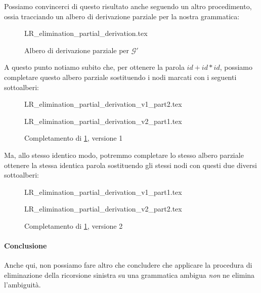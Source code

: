 \documentclass[class=book, crop=false, oneside, 12pt]{standalone}
\begin{document}
Possiamo convincerci di questo risultato anche seguendo un altro procedimento, ossia tracciando un albero di derivazione parziale per la nostra grammatica:
\begin{figure}[H]
    \centering
    {LR_elimination_partial_derivation.tex}
    \caption{Albero di derivazione parziale per \(\mathcal{G'}\)}
    \label{fxness-lrremove- ambiguity_1}
\end{figure}
A questo punto notiamo subito che, per ottenere la parola \(id + id * id\), possiamo completare questo albero parziale sostituendo i nodi marcati con i seguenti sottoalberi:
\begin{figure}[H]
    \begin{minipage}[b]{0.4\textwidth}
        \centering
        {LR_elimination_partial_derivation_v1_part2.tex}
        \subcaption{}
        \label{fxness-lrremove- ambiguity_2_2}
    \end{minipage}
    \hfill
    \begin{minipage}[b]{0.4\textwidth}
        \centering
        {LR_elimination_partial_derivation_v2_part1.tex}
        \subcaption{}
        \label{fxness-lrremove- ambiguity_2_1}
    \end{minipage}
    \caption{Completamento di \ref{fxness-lrremove- ambiguity_1}, versione 1}
    \label{fxness-lrremove- ambiguity_2}
\end{figure}
Ma, allo stesso identico modo, potremmo completare lo stesso albero parziale ottenere la stessa identica parola sostituendo gli stessi nodi con questi due diversi sottoalberi:
\begin{figure}[H]
    \begin{minipage}[b]{0.4\textwidth}
        \centering
        {LR_elimination_partial_derivation_v1_part1.tex}
        \subcaption{}
        \label{fxness-lrremove- ambiguity_3_1}
    \end{minipage}
    \hfill
    \begin{minipage}[b]{0.4\textwidth}
        \centering
        {LR_elimination_partial_derivation_v2_part2.tex}
        \subcaption{}
        \label{fxness-lrremove- ambiguity_3_2}
    \end{minipage}
    \caption{Completamento di \ref{fxness-lrremove- ambiguity_1}, versione 2}
    \label{fxness-lrremove- ambiguity_3}
\end{figure}

\paragraph{Conclusione}
Anche qui, non possiamo fare altro che concludere che applicare la procedura di eliminazione della ricorsione sinistra su una grammatica ambigua \emph{non} ne elimina l'ambiguità.
\end{document}
